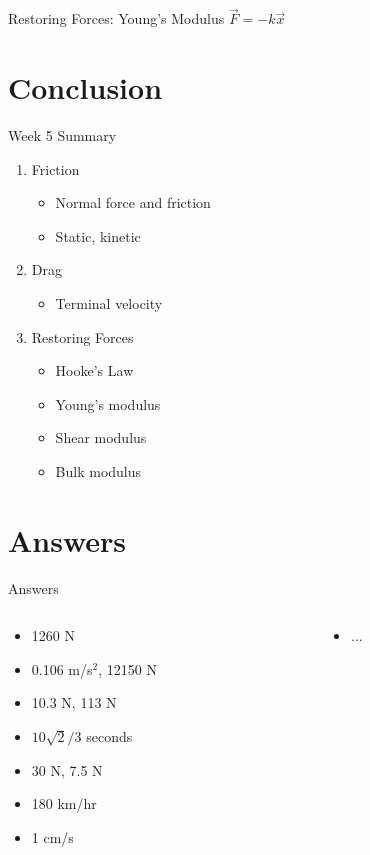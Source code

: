 \documentclass{beamer}
\begin{document}
\begin{frame}{Restoring Forces: Young's Modulus}
\alert{$\vec{F} = -k\vec{x}$}
\end{frame}

\section{Conclusion}

\begin{frame}{Week 5 Summary}
\begin{enumerate}
\item \alert{Friction}
\begin{itemize}
\item Normal force and friction
\item Static, kinetic
\end{itemize}
\item \alert{Drag}
\begin{itemize}
\item Terminal velocity
\end{itemize}
\item \alert{Restoring Forces}
\begin{itemize}
\item Hooke's Law
\item Young's modulus
\item Shear modulus
\item Bulk modulus
\end{itemize}
\end{enumerate}
\end{frame}

\section{Answers}

\begin{frame}{Answers}
\begin{columns}[T]
\begin{column}{0.5\textwidth}
\begin{itemize}
\item 1260 N
\item 0.106 m/s$^2$, 12150 N
\item 10.3 N, 113 N
\item $10\sqrt{2}/3$ seconds
\item 30 N, 7.5 N
\item 180 km/hr
\item 1 cm/s
\end{itemize}
\end{column}
\begin{column}{0.5\textwidth}
\begin{itemize}
\item ...
\end{itemize}
\end{column}
\end{columns}
\end{frame}
\end{document}
